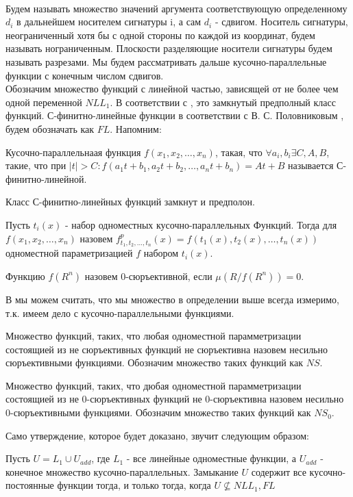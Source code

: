 \documentclass[main.tex]{subfiles}
\begin{document}
\\
Будем называть множество значений аргумента соответствующую определенному
$d_i$ в дальнейшем носителем сигнатуры i, а сам $d_i$ - сдвигом.
Носитель сигнатуры, неограниченный хотя бы с одной стороны по каждой из координат, будем называть нограниченным.
Плоскости разделяющие носители сигнатуры будем называть разрезами.
Мы будем рассматривать дальше кусочно-параллельные функции с конечным числом сдвигов.\\
Обозначим множество функций с линейной частью, зависящей от не более чем одной переменной $NLL_1$.
В соответствии с \cite{Otro1}, это замкнутый предполный класс функций.
С-финитно-линейные функции в соответствии с В. С. Половниковым \cite{Polov1},
будем обозначать как $FL$. Напомним:
\begin{definition}
  Кусочно-параллельнаая функция $f(x_1, x_2, \ldots, x_n)$, такая, что $\forall a_i, b_i \exists C, A, B$, такие, что при
  $|t| > C: f(a_1 t + b_1, a_2 t + b_2, \ldots, a_n t + b_n) = A t + B$ называется С-финитно-линейной.
\end{definition}
Класс С-финитно-линейных функций замкнут и предполон.
\begin{definition}
  Пусть $t_i(x)$ - набор одноместных кусочно-параллельных Функций. 
  Тогда для $f(x_1, x_2, \ldots, x_n)$ назовем $f^{p}_{t_1, t_2, \ldots, t_n}(x) = f(t_1(x), t_2(x), \ldots, t_n(x))$
  одноместной параметризацией $f$ набором $t_i(x)$.
\end{definition}
\begin{definition}
  Функцию $f(R^n)$ назовем 0-сюръективной, если $\mu(R / f(R^n)) = 0$.
\end{definition}
    В мы можем считать, что мы множество в определении выше всегда измеримо, т.к. имеем дело с кусочно-параллельными функциями.
\begin{definition}
Множество функций, таких, что любая одноместной парамметризации состоящией из не сюръективных функций не сюръективна назовем несильно сюръективными функциями. Обозначим множество таких функций как $NS$.
\end{definition}
\begin{definition}
Множество функций, таких, что дюбая одноместной парамметризации состоящией из не 0-сюръективных функций не 0-сюръективна назовем несильно 0-сюръективными функциями. Обозначим множество таких функций как $NS_0$.
\end{definition}

Само утверждение, которое будет доказано, звучит следующим образом:
\begin{theorem} \label{th:main}
  Пусть $U = L_1 \cup U_{add}$, где $L_1$ - все линейные одноместные функции, а $U_{add}$ - конечное множество кусочно-параллельных.
  Замыкание $U$ содержит все кусочно-постоянные функции тогда, и только тогда, когда $U \not\subseteq NLL_1, FL$
\end{theorem}
\end{document}
